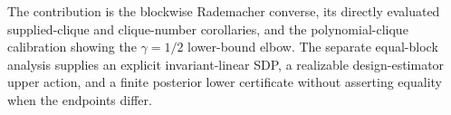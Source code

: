 The contribution is the blockwise Rademacher converse, its directly evaluated supplied-clique and clique-number corollaries, and the polynomial-clique calibration showing the \(\gamma=1/2\) lower-bound elbow.  The separate equal-block analysis supplies an explicit invariant-linear SDP, a realizable design-estimator upper action, and a finite posterior lower certificate without asserting equality when the endpoints differ.